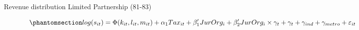 \documentclass[
  12pt]{article}
\theoremstyle{definition}
\theoremstyle{remark}
\begin{document}
\begin{figure}

\caption{\label{fig-revenue-hist-bunch-1}Revenue distribution Limited
Partnership (81-83)}


\end{figure}%

\begin{equation}\phantomsection\label{eq-reg-tax-jo}{
log(s_{it})= \Phi(k_{it},l_{it},m_{it})+ \alpha_1Tax_{it}+\mathbf{\beta}_1'JurOrg_i + \beta_2'JurOrg_i\times\gamma_t+ \gamma_t + \gamma_{ind} +\gamma_{metro} + \varepsilon_{it}
}\end{equation}
\end{document}
